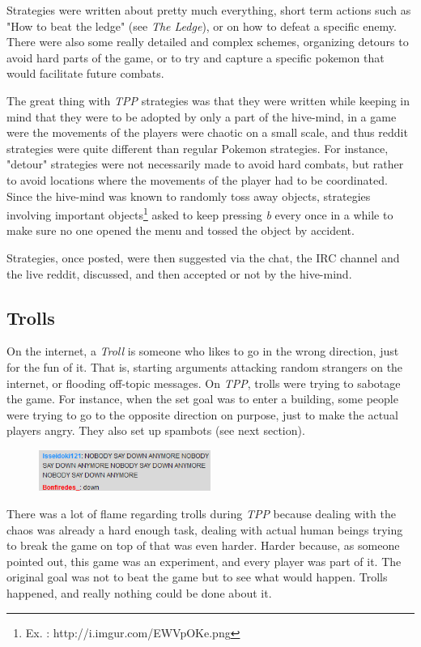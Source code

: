 \documentclass[a4paper]{article}
\begin{document}
Strategies were written about pretty much everything, short term actions such as "How to beat the ledge" (see \textit{The Ledge}), or on how to defeat a specific enemy. There were also some really detailed and complex schemes, organizing detours to avoid hard parts of the game, or to try and capture a specific pokemon that would facilitate future combats.

The great thing with \textit{TPP} strategies was that they were written while keeping in mind that they were to be adopted by only a part of the hive-mind, in a game were the movements of the players were chaotic on a small scale, and thus reddit strategies were quite different than regular Pokemon strategies. For instance, "detour" strategies were not necessarily made to avoid hard combats, but rather to avoid locations where the movements of the player had to be coordinated. Since the hive-mind was known to randomly toss away objects, strategies involving important objects\footnote{Ex. : http://i.imgur.com/EWVpOKe.png} asked to keep pressing \textit{b} every once in a while to make sure no one opened the menu and tossed the object by accident.

Strategies, once posted, were then suggested via the chat, the IRC channel and the live reddit, discussed, and then accepted or not by the hive-mind.

\subsection{Trolls}

On the internet, a \textit{Troll} is someone who likes to go in the wrong direction, just for the fun of it. That is, starting arguments attacking random strangers on the internet, or flooding off-topic messages. On \textit{TPP}, trolls were trying to sabotage the game. For instance, when the set goal was to enter a building, some people were trying to go to the opposite direction on purpose, just to make the actual players angry. They also set up spambots (see next section).

\begin{figure}[h]
\includegraphics[width=0.5\textwidth,center]{pictures/troll1.png}
\end{figure}

There was a lot of flame regarding trolls during \textit{TPP} because dealing with the chaos was already a hard enough task, dealing with actual human beings trying to break the game on top of that was even harder. Harder because, as someone pointed out, this game was an experiment, and every player was part of it. The original goal was not to beat the game but to see what would happen. Trolls happened, and really nothing could be done about it.
\end{document}
